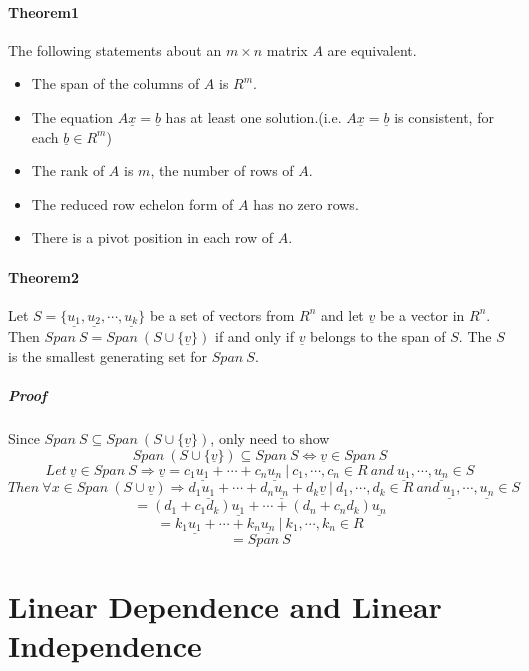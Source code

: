 \documentclass[12pt]{article}
\begin{document}
\paragraph{Theorem1}
The following statements about an $m\times n$ matrix $A$ are equivalent.
\begin{itemize}
\item The span of the columns of $A$ is $R^m$.
\item The equation $A\underline{x}=\underline{b}$ has at least one solution.(i.e. $A\underline{x}=\underline{b}$ is consistent, for each $\underline{b} \in R^m$)
\item The rank of $A$ is $m$, the number of rows of $A$.
\item The reduced row echelon form of $A$ has no zero rows.
\item There is a pivot position in each row of $A$.
\end{itemize}
\paragraph{Theorem2}
Let $S=\lbrace \underline{u_1},\underline{u_2},\cdots,\underline{u_k}\rbrace$ be a set of vectors from $R^n$ and let $\underline{v}$ be a vector in $R^n$. Then $Span\ S = Span\ (S \cup \lbrace \underline{v}\rbrace)$ if and only if $\underline{v}$ belongs to the span of $S$. The $S$ is the smallest generating set for $Span\ S$.
\subparagraph{Proof}
Since $Span\ S \subseteq Span\ (S\cup \lbrace\underline{v}\rbrace)$, only need to show $$Span\ (S\cup \lbrace\underline{v}\rbrace) \subseteq Span\ S \Leftrightarrow \underline{v} \in Span\ S$$
$$
Let\ \underline{v} \in Span\ S \Rightarrow \underline{v} = c_1\underline{u_1}+\cdots+c_n\underline{u_n}\ |\ c_1,\cdots,c_n \in R\ and\ \underline{u_1},\cdots,\underline{u_n} \in S
$$
$$
Then\ \forall x \in Span\ (S \cup \underline{v}) \Rightarrow d_1\underline{u_1}+\cdots+d_n\underline{u_n}+d_k\underline{v}\ |\ d_1,\cdots,d_k \in R\ and\ \underline{u_1},\cdots,\underline{u_n} \in S
$$
$$
=(d_1+c_1d_k)\underline{u_1}+\cdots+(d_n+c_nd_k)\underline{u_n}
$$
$$
=k_1\underline{u_1} + \cdots + k_n\underline{u_n}\ |\ k_1,\cdots,k_n \in R
$$
$$
= Span\ S
$$

\section{Linear Dependence and Linear Independence}
\end{document}
